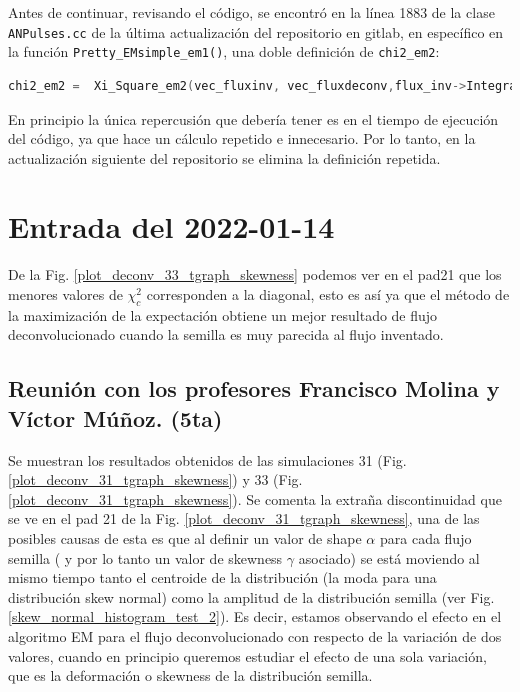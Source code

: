 \documentclass[11pt,letterpaper]{article}
\begin{document}
Antes de continuar, revisando el código, se encontró en la línea 1883 de la clase \verb|ANPulses.cc| de la última actualización del repositorio en gitlab, en específico en la función \verb|Pretty_EMsimple_em1()|, una doble definición de \verb|chi2_em2|:

\begin{lstlisting}[language=c++]
	 chi2_em2 =  Xi_Square_em2(vec_fluxinv, vec_fluxdeconv,flux_inv->Integral() , flux_inv->GetNbinsX());chi2_em2 =  Xi_Square_em2(vec_fluxinv, vec_fluxdeconv,flux_deconv->Integral() , flux_inv->GetNbinsX());
\end{lstlisting}

En  principio la única repercusión que debería tener es en el tiempo de ejecución del código, ya que hace un cálculo repetido e innecesario. Por lo tanto, en la actualización siguiente del repositorio se elimina la definición repetida.

\section{Entrada del 2022-01-14}\label{2022-01-14}

De la Fig. \ref{plot_deconv_33_tgraph_skewness} podemos ver en el pad21 que los menores valores de $\chi_c^2$ corresponden a la diagonal, esto es así ya que el método de la maximización de la expectación obtiene un mejor resultado de flujo deconvolucionado cuando la semilla es muy parecida al flujo inventado.

\subsection*{Reunión con los profesores Francisco Molina y Víctor Múñoz. (5ta)} 

Se muestran los resultados obtenidos de las simulaciones 31 (Fig. \ref{plot_deconv_31_tgraph_skewness}) y 33 (Fig. \ref{plot_deconv_31_tgraph_skewness}). Se comenta la extraña discontinuidad que se ve en el pad 21 de la Fig. \ref{plot_deconv_31_tgraph_skewness}, una de las posibles causas de esta es que al definir un valor de shape $\alpha$ para cada flujo semilla ( y por lo tanto un valor de skewness $\gamma$ asociado) se está moviendo al mismo tiempo tanto el centroide de la distribución (la moda para una distribución skew normal) como la amplitud de la distribución semilla (ver Fig. \ref{skew_normal_histogram_test_2}). Es decir, estamos observando el efecto en el algoritmo EM para el flujo deconvolucionado con respecto de la variación de dos valores, cuando en principio queremos estudiar el efecto de una sola variación, que es la deformación o skewness de la distribución semilla.
\end{document}
